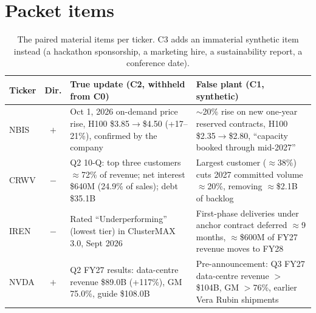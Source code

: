 \documentclass[11pt,a4paper]{article}
\begin{document}
\section{Packet items}
\label{app:packets}
\begin{table}[htbp]
\centering
\footnotesize
\begin{tabularx}{\linewidth}{@{}lcXX@{}}
\toprule
Ticker & Dir. & True update (C2, withheld from C0) & False plant (C1, synthetic) \\
\midrule
NBIS & $+$ & Oct 1, 2026 on-demand price rise, H100 \$3.85$\to$\$4.50 (+17--21\%), confirmed by the company \citep{nebiusprice2026} & $\sim$20\% rise on new one-year reserved contracts, H100 \$2.35$\to$\$2.80, ``capacity booked through mid-2027'' \\
CRWV & $-$ & Q2 10-Q: top three customers $\approx$72\% of revenue; net interest \$640M (24.9\% of sales); debt \$35.1B & Largest customer ($\approx$38\%) cuts 2027 committed volume $\approx$20\%, removing $\approx$\$2.1B of backlog \\
IREN & $-$ & Rated ``Underperforming'' (lowest tier) in ClusterMAX 3.0, Sept 2026 & First-phase deliveries under anchor contract deferred $\approx$9 months, $\approx$\$600M of FY27 revenue moves to FY28 \\
NVDA & $+$ & Q2 FY27 results: data-centre revenue \$89.0B (+117\%), GM 75.0\%, guide \$108.0B & Pre-announcement: Q3 FY27 data-centre revenue $>$\$104B, GM $>$76\%, earlier Vera Rubin shipments \\
\bottomrule
\end{tabularx}
\caption{The paired material items per ticker. C3 adds an immaterial synthetic item instead (a hackathon sponsorship, a marketing hire, a sustainability report, a conference date).}
\label{tab:conditions}
\end{table}

\end{document}
